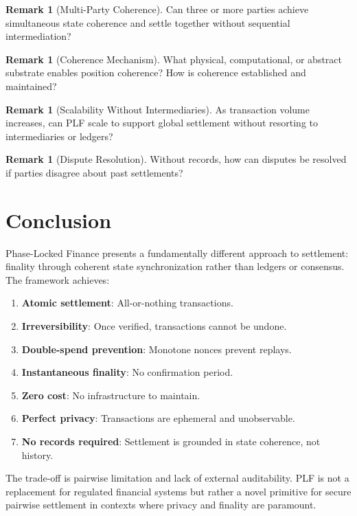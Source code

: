 \documentclass[twocolumn,10pt,a4paper]{article}
\theoremstyle{plain}
\theoremstyle{definition}
\newtheorem{remark}[theorem]{Remark}
\begin{document}
\begin{remark}[Multi-Party Coherence]
Can three or more parties achieve simultaneous state coherence and settle together without sequential intermediation?
\end{remark}

\begin{remark}[Coherence Mechanism]
What physical, computational, or abstract substrate enables position coherence? How is coherence established and maintained?
\end{remark}

\begin{remark}[Scalability Without Intermediaries]
As transaction volume increases, can PLF scale to support global settlement without resorting to intermediaries or ledgers?
\end{remark}

\begin{remark}[Dispute Resolution]
Without records, how can disputes be resolved if parties disagree about past settlements?
\end{remark}

\section{Conclusion}

Phase-Locked Finance presents a fundamentally different approach to settlement: finality through coherent state synchronization rather than ledgers or consensus. The framework achieves:

\begin{enumerate}
\item \textbf{Atomic settlement}: All-or-nothing transactions.
\item \textbf{Irreversibility}: Once verified, transactions cannot be undone.
\item \textbf{Double-spend prevention}: Monotone nonces prevent replays.
\item \textbf{Instantaneous finality}: No confirmation period.
\item \textbf{Zero cost}: No infrastructure to maintain.
\item \textbf{Perfect privacy}: Transactions are ephemeral and unobservable.
\item \textbf{No records required}: Settlement is grounded in state coherence, not history.
\end{enumerate}

The trade-off is pairwise limitation and lack of external auditability. PLF is not a replacement for regulated financial systems but rather a novel primitive for secure pairwise settlement in contexts where privacy and finality are paramount.



\end{document}
